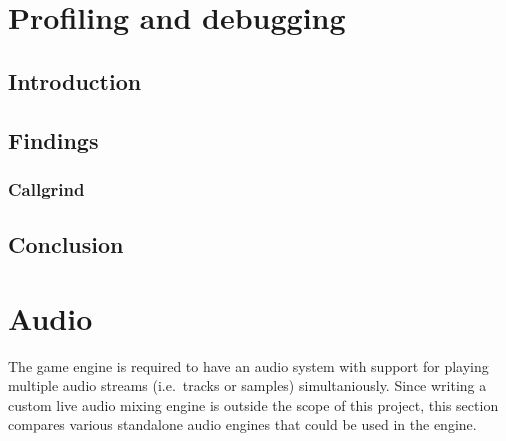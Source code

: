 \documentclass{projdoc}
\begin{document}
\section{Profiling and debugging}



\subsection{Introduction}

\subsection{Findings}

\subsubsection{Callgrind}

\begin{comparison}
\end{comparison}

\subsection{Conclusion}

\section{Audio}


The game engine is required to have an audio system with support for playing multiple
audio streams (i.e.~tracks or samples) simultaniously. Since writing a custom live
audio mixing engine is outside the scope of this project, this section compares
various standalone audio engines that could be used in the engine.

\end{document}
